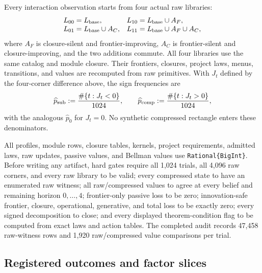 Every interaction observation starts from four actual raw libraries:
\[
\begin{array}{ll}
 L_{00}=L_{\rm base},&
 L_{10}=L_{\rm base}\cup A_F,\\
 L_{01}=L_{\rm base}\cup A_C,&
 L_{11}=L_{\rm base}\cup A_F\cup A_C,
\end{array}
\]
where \(A_F\) is closure-silent and frontier-improving, \(A_C\) is
frontier-silent and closure-improving, and the two additions commute.  All
four libraries use the same catalog and module closure.  Their frontiers,
closures, project laws, menus, transitions, and values are recomputed from raw
primitives.  With \(J_t\) defined by the four-corner difference above, the
sign frequencies are
\[
 \widehat p_{\rm sub}:=
 \frac{\#\{t:J_t<0\}}{1024},\qquad
 \widehat p_{\rm comp}:=
 \frac{\#\{t:J_t>0\}}{1024},
\]
with the analogous \(\widehat p_0\) for \(J_t=0\).  No synthetic compressed
rectangle enters these denominators.

All profiles, module rows, closure tables, kernels, project requirements,
admitted laws, raw updates, passive values, and Bellman values use
\texttt{Rational\{BigInt\}}.  Before writing any artifact, hard gates require
all 1,024 trials, all 4,096 raw corners, and every raw library to be valid;
every compressed state to have an enumerated raw witness; all raw/compressed
values to agree at every belief and remaining horizon \(0,\ldots,4\);
frontier-only passive loss to be zero; innovation-safe frontier, closure,
operational, generative, and total loss to be exactly zero; every signed
decomposition to close; and every displayed theorem-condition flag to be
computed from exact laws and action tables.  The completed audit records
47,458 raw-witness rows and 1,920 raw/compressed value comparisons per trial.

\subsection{Registered outcomes and factor slices}

